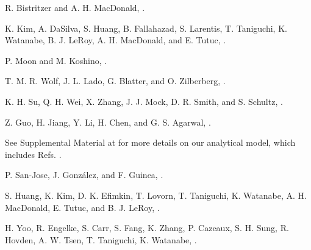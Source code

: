 \documentclass[%
reprint,
amsmath,amssymb,amsfonts
aps,
superscriptaddress,
prx
]{revtex4-1}
\begin{document}
\begin{thebibliography}{99}
 R. Bistritzer and A. H. MacDonald, 
\href{https://doi.org/10.1073/pnas.1108174108}{}.

 K. Kim, A. DaSilva, S. Huang, B. Fallahazad, S. Larentis, T. Taniguchi, K. Watanabe, B. J. LeRoy, A. H. MacDonald, and E. Tutuc, 
\href{https://doi.org/10.1073/pnas.1620140114}{}.


 P. Moon and M. Koshino, 
\href{https://doi.org/10.1103/PhysRevB.87.205404}{}.

 T. M. R. Wolf, J. L. Lado, G. Blatter, and O. Zilberberg, 
\href{https://doi.org/10.1103/PhysRevLett.123.096802}{}.

 K. H. Su, Q. H. Wei, X. Zhang, J. J. Mock, D. R. Smith, and S. Schultz, 
\href{https://doi.org/10.1021/nl034197f}{}.

 Z. Guo, H. Jiang, Y. Li, H. Chen, and G. S. Agarwal, 
\href{https://doi.org/10.1364/OE.26.000627}{}.


 See Supplemental Material at \href{URL}{\color{blue}{URL}} for more details on our analytical model, which includes Refs. \cite{SM_1,SM_2}.

 P. San-Jose, J. González, and F. Guinea, \href{https://doi.org/10.1103/PhysRevLett.108.216802}{}.

 S. Huang, K. Kim, D. K. Efimkin, T. Lovorn, T. Taniguchi, K. Watanabe, A. H. MacDonald, E. Tutuc, and B. J. LeRoy, \href{https://doi.org/10.1103/PhysRevLett.121.037702}{}.

 H. Yoo, R. Engelke, S. Carr, S. Fang, K. Zhang, P. Cazeaux, S. H. Sung, R. Hovden, A. W. Tsen, T. Taniguchi, K. Watanabe, \href{https://doi.org/10.1103/PhysRevLett.121.037702}{}. 


\end{thebibliography}
\end{document}
